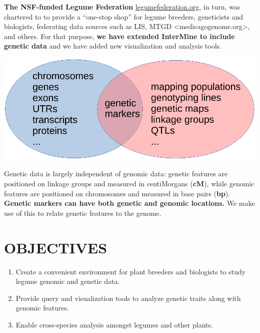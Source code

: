 \documentclass[]{pagposter}
\newlength{\figwidth}
\begin{document}
\begin{multicols*}{3}
  \textbf{The NSF-funded Legume Federation} \url{legumefederation.org}, in turn, was chartered to to provide a ``one-stop shop'' for legume breeders, geneticists and biologists, federating data sources such as LIS, MTGD <medicagogenome.org>, and others.
  For that purpose, \textbf{we have extended InterMine to include genetic data} and we have added new visualization and analysis tools.

  \begin{center}
    \includegraphics[width=\figwidth]{genetics-genomics-venn.pdf} %
  \end{center}

  Genetic data is largely independent of genomic data: genetic features are positioned on linkage groups and measured in centiMorgans (\textbf{cM}), while genomic features are positioned on chromosomes and measured in base pairs (\textbf{bp}).
  \textbf{Genetic markers can have both genetic and genomic locations.} We make use of this to relate genetic features to the genome.


  \section*{OBJECTIVES}
  
  \begin{enumerate}
  \item Create a convenient environment for plant breeders and biologists to study legume genomic and genetic data.
  \item Provide query and visualization tools to analyze genetic traits along with genomic features.
  \item Enable cross-species analysis amongst legumes and other plants.
  \end{enumerate}


\end{multicols*}
\end{document}
